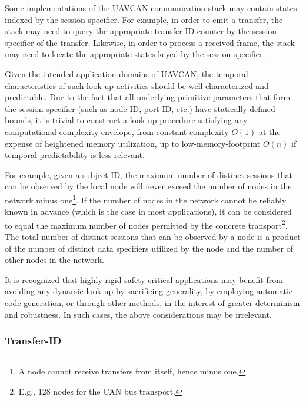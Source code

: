 \begin{remark}[breakable]
    Some implementations of the UAVCAN communication stack may contain states indexed by the session specifier.
    For example, in order to emit a transfer, the stack may need to query the appropriate transfer-ID counter
    by the session specifier of the transfer.
    Likewise, in order to process a received frame,
    the stack may need to locate the appropriate states keyed by the session specifier.

    Given the intended application domains of UAVCAN,
    the temporal characteristics of such look-up activities should be well-characterized and predictable.
    Due to the fact that all underlying primitive parameters that form the session specifier
    (such as node-ID, port-ID, etc.) have statically defined bounds,
    it is trivial to construct a look-up procedure satisfying any computational complexity envelope,
    from constant-complexity $O(1)$ at the expense of heightened memory utilization,
    up to low-memory-footprint $O(n)$ if temporal predictability is less relevant.

    For example, given a subject-ID, the maximum number of distinct sessions that can be observed
    by the local node will never exceed the number of nodes in the network minus one\footnote{%
        A node cannot receive transfers from itself, hence minus one.
    }.
    If the number of nodes in the network cannot be reliably known in advance (which is the case in most applications),
    it can be considered to equal the maximum number of nodes permitted by the concrete transport\footnote{%
        E.g., 128 nodes for the CAN bus transport.
    }.
    The total number of distinct sessions that can be observed by a node is a product of the number
    of distinct data specifiers utilized by the node and the number of other nodes in the network.

    It is recognized that highly rigid safety-critical applications may benefit from avoiding any
    dynamic look-up by sacrificing generality, by employing automatic code generation, or through other methods,
    in the interest of greater determinism and robustness.
    In such cases, the above considerations may be irrelevant.
\end{remark}

\subsubsection{Transfer-ID}\label{sec:transport_transfer_id}


